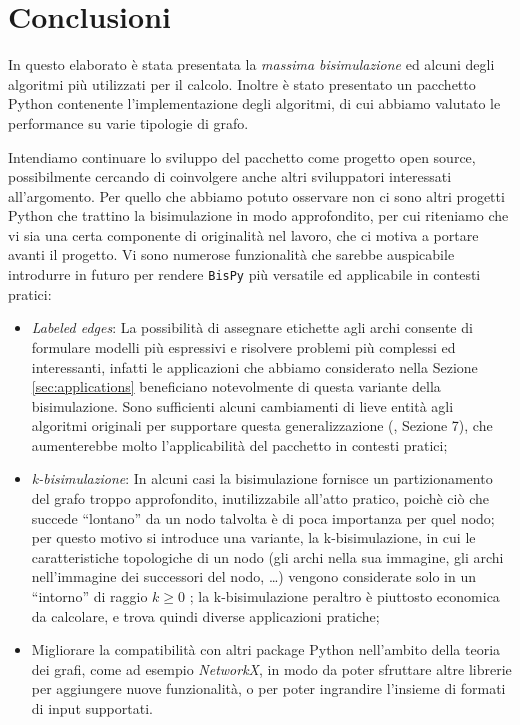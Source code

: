 \section*{Conclusioni}
\label{sec:conclusions}

In questo elaborato è stata presentata la \emph{massima bisimulazione} ed alcuni degli algoritmi più utilizzati per il calcolo. Inoltre è stato presentato un pacchetto Python contenente l'implementazione degli algoritmi, di cui abbiamo valutato le performance su varie tipologie di grafo.

Intendiamo continuare lo sviluppo del pacchetto come progetto open source, possibilmente cercando di coinvolgere anche altri sviluppatori interessati all'argomento. Per quello che abbiamo potuto osservare non ci sono altri progetti Python che trattino la bisimulazione in modo approfondito, per cui riteniamo che vi sia una certa componente di originalità nel lavoro, che ci motiva a portare avanti il progetto. Vi sono numerose funzionalità che sarebbe auspicabile introdurre in futuro per rendere \texttt{BisPy} più versatile ed applicabile in contesti pratici:
\begin{itemize}
    \item \emph{Labeled edges}: La possibilità di assegnare etichette agli archi consente di formulare modelli più espressivi e risolvere problemi più complessi ed interessanti, infatti le applicazioni che abbiamo considerato nella Sezione \ref{sec:applications} beneficiano notevolmente di questa variante della bisimulazione. Sono sufficienti alcuni cambiamenti di lieve entità agli algoritmi originali per supportare questa generalizzazione (\cite{dovier}, Sezione 7), che aumenterebbe molto l'applicabilità del pacchetto in contesti pratici;
    \item \emph{k-bisimulazione}: In alcuni casi la bisimulazione fornisce un partizionamento del grafo troppo approfondito, inutilizzabile all'atto pratico, poichè ciò che succede ``lontano'' da un nodo talvolta è di poca importanza per quel nodo; per questo motivo si introduce una variante, la k-bisimulazione, in cui le caratteristiche topologiche di un nodo (gli archi nella sua immagine, gli archi nell'immagine dei successori del nodo, \dots) vengono considerate solo in un ``intorno'' di raggio $k \geq 0$ \cite{kbisi}; la k-bisimulazione peraltro è piuttosto economica da calcolare, e trova quindi diverse applicazioni pratiche;
    \item Migliorare la compatibilità con altri package Python nell'ambito della teoria dei grafi, come ad esempio \emph{NetworkX}, in modo da poter sfruttare altre librerie per aggiungere nuove funzionalità, o per poter ingrandire l'insieme di formati di input supportati.
\end{itemize}
